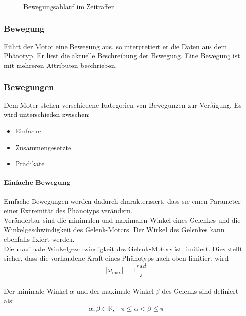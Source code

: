 \begin{figure}[H]
        \caption{Bewegungsablauf im Zeitraffer\label{fig:ConceptMovement}}

      \end{figure}

    \subsubsection{Bewegung\label{subsub:EngineMovement}}

      Führt der Motor eine Bewegung aus, so interpretiert er die Daten aus dem Phänotyp.
      Er liest die aktuelle Beschreibung der Bewegung.
      Eine Bewegung ist mit mehreren Attributen beschrieben.


    \subsubsection{Bewegungen\label{subsub:EngineMovements}}

      Dem Motor stehen verschiedene Kategorien von Bewegungen zur Verfügung.
      Es wird unterschieden zwischen:

      \begin{itemize}
        \item Einfache
        \item Zusammengesetzte
        \item Prädikate
      \end{itemize}

      \paragraph{Einfache Bewegung\label{EngineMovementsSimple}}

        Einfache Bewegungen werden dadurch charakterisiert,
        dass sie einen Parameter einer Extremität des Phänotyps verändern.
        \\
        Veränderbar sind die minimalen und maximalen Winkel eines Gelenkes und die Winkelgeschwindigkeit des
        Gelenk-Motors. Der Winkel des Gelenkes kann ebenfalls fixiert werden.
        \\
        Die maximale Winkelgeschwindigkeit des Gelenk-Motors ist limitiert.
        Dies stellt sicher, dass die vorhandene Kraft eines Phänotyps nach oben limitiert wird.
        \[ {\lvert} \omega_{\max} {\rvert} = 1\frac{rad}{s}\]
        \\
        Der minimale Winkel \(\alpha \) und der maximale Winkel \(\beta \) des Gelenks sind definiert als:
        \[ \alpha, \beta \in \mathbb{R}, -\pi \leq \alpha < \beta \leq \pi \]

